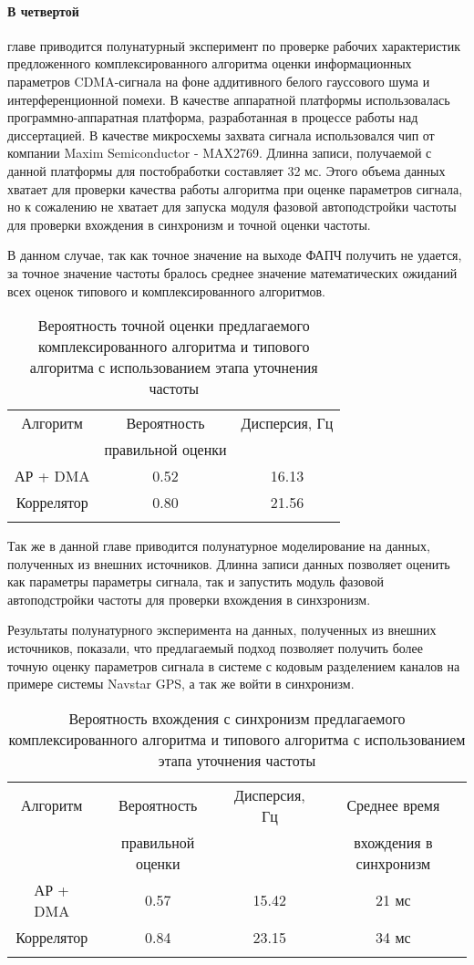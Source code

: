 \paragraph{В четвертой} главе приводится полунатурный эксперимент по проверке рабочих характеристик предложенного комплексированного алгоритма
оценки информационных параметров CDMA-сигнала на фоне аддитивного белого гауссового шума и интерференционной помехи.
В качестве аппаратной платформы использовалась программно-аппаратная платформа, разработанная в процессе работы над диссертацией.
В качестве микросхемы захвата сигнала использовался чип от компании Maxim Semiconductor - MAX2769. Длинна записи, получаемой
с данной платформы для постобработки составляет 32 мс. Этого объема данных хватает для проверки качества работы алгоритма при оценке
параметров сигнала, но к сожалению не хватает для запуска модуля фазовой автоподстройки частоты для проверки вхождения в синхронизм и точной оценки частоты.

В данном случае, так как точное значение на выходе ФАПЧ получить не удается, за точное значение частоты бралось среднее значение математических
ожиданий всех оценок типового и комплексированного алгоритмов.

{\centering
\begin{longtable}{ | c | c | c |}
	\hline
	Алгоритм	& Вероятность	& Дисперсия, Гц \\
			& правильной оценки&		\\ \hline
	АР + DMA	& 0.52 & 16.13	\\ \hline
	Коррелятор 	& 0.80 &  21.56 \\ \hline
	\caption{Вероятность точной оценки предлагаемого комплексированного алгоритма и типового алгоритма с использованием этапа уточнения частоты}
	\label{tbl:16MHz}
\end{longtable}}

Так же в данной главе приводится полунатурное моделирование на данных, полученных из внешних источников. Длинна записи данных
позволяет оценить как параметры параметры сигнала, так и запустить модуль фазовой автоподстройки частоты для проверки вхождения в синхзронизм.

Результаты полунатурного эксперимента на данных, полученных из внешних источников, показали, что предлагаемый подход позволяет получить более точную оценку параметров
сигнала в системе с кодовым разделением каналов на примере системы Navstar GPS, а так же войти в синхронизм.
{\centering
\begin{longtable}{ | c | c | c | c |}
	\hline
	Алгоритм	& Вероятность	& Дисперсия, Гц & Среднее время \\
			& правильной оценки&		& вхождения в синхронизм\\ \hline
	АР + DMA	& 0.57 		& 15.42		& 21 мс \\ \hline
	Коррелятор 	& 0.84 		& 23.15 	& 34 мс \\ \hline
	\caption{Вероятность вхождения с синхронизм предлагаемого комплексированного алгоритма и типового алгоритма с использованием этапа уточнения частоты}
	\label{tbl:5MHz}
\end{longtable}}

